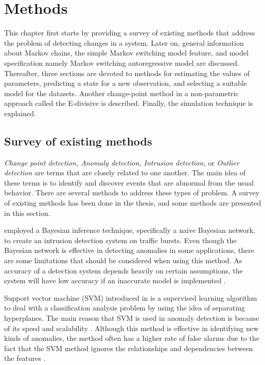 
\lhead[\chaptername~\thechapter]{\rightmark}

\rhead[\leftmark]{}

\lfoot[\thepage]{}

\cfoot{}

\rfoot[]{\thepage}

\chapter{Methods}

This chapter first starts by providing a survey of existing methods
that address the problem of detecting changes in a system. Later on,
general information about Markov chains, the simple Markov switching
model feature, and model specification namely Markov switching autoregressive
model are discussed. Thereafter, three sections are devoted to methods
for estimating the values of parameters, predicting a state for a
new observation, and selecting a suitable model for the datasets.
Another change-point method in a non-parametric approach called the
E-divisive is described. Finally, the simulation technique is explained.

\section{Survey of existing methods}

\emph{Change point detection, Anomaly detection, Intrusion detection,
}or \emph{Outlier detection} are terms that are closely related to
one another. The main idea of these terms is to identify and discover
events that are abnormal from the usual behavior. There are several
methods to address these types of problem. A survey of existing methods
has been done in the thesis, and some methods are presented in this
section.

\citet{valdes2000adaptive} employed a Bayesian inference technique,
specifically a naive Bayesian network, to create an intrusion detection
system on traffic bursts. Even though the Bayesian network is effective
in detecting anomalies in some applications, there are some limitations
that should be considered when using this method. As accuracy of a
detection system depends heavily on certain assumptions, the system
will have low accuracy if an inaccurate model is implemented \citep{patcha2007overview}.

Support vector machine (SVM) introduced in \citet{cortes1995support}
is a supervised learning algorithm to deal with a classification analysis
problem by using the idea of separating hyperplanes. The main reason
that SVM is used in anomaly detection is because of its speed and
scalability \citep{sung2003identifying}. Although this method is
effective in identifying new kinds of anomalies, the method often
has a higher rate of false alarms due to the fact that the SVM method
ignores the relationships and dependencies between the features \citep{sarasamma2005hierarchical}. 

